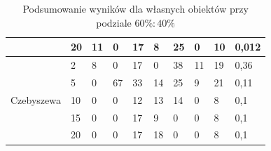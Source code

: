 \documentclass{classrep}
\begin{document}
\begin{table}[!ht]
\begin{tabular}{|l||l|l|l|l|l|l|l|l|l|}
                                      & 20                          & 11             & 0     & 17        & 8   & 25      & 0        & 10     & 0,012                                  \\ \hline
    \multirow{5}{*}{Czebyszewa}       & 2                           & 8              & 0     & 17        & 0   & 38      & 11       & 19     & 0,36                                   \\ \cline{2-10} 
                                      & 5                           & 0              & 67    & 33        & 14  & 25      & 9        & 21     & 0,11                                   \\ \cline{2-10} 
                                      & 10                          & 0              & 0     & 12        & 13  & 14      & 0        & 8      & 0,1                                    \\ \cline{2-10} 
                                      & 15                          & 0              & 0     & 17        & 9   & 0       & 0        & 8      & 0,1                                    \\ \cline{2-10} 
                                      & 20                          & 0              & 0     & 17        & 18  & 0       & 0        & 8      & 0,1                                    \\ \hline
    \end{tabular}
    \caption{Podsumowanie wyników dla własnych obiektów przy podziale $60\%:40\%$}
\end{table}
\end{document}
